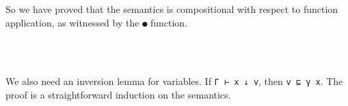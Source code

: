 So we have proved that the semantics is compositional with respect to
function application, as witnessed by the \texttt{●} function.

\begin{fence}
\begin{code}%
\>[0]\AgdaSpace{}%
\AgdaSymbol{:}\AgdaSpace{}%
\AgdaSymbol{\}\{}\AgdaSpace{}%
\AgdaSpace{}%
\AgdaSymbol{:}\AgdaSpace{}%
\AgdaSpace{}%
\AgdaSpace{}%
\AgdaSymbol{\}}\<%
\\
\>[0][@{}l@{\AgdaIndent{0}}]%
\>[2]\AgdaSpace{}%
\AgdaSpace{}%
\AgdaSymbol{(}\AgdaSpace{}%
\AgdaSpace{}%
\AgdaSymbol{)}\AgdaSpace{}%
\AgdaSpace{}%
\AgdaSymbol{(}\AgdaSpace{}%
\AgdaSymbol{)}\AgdaSpace{}%
\AgdaSpace{}%
\AgdaSymbol{(}\AgdaSpace{}%
\AgdaSymbol{)}\<%
\\
\>[0]\AgdaSpace{}%
\AgdaSpace{}%
\AgdaSpace{}%
\AgdaSymbol{=}\AgdaSpace{}%
\AgdaSpace{}%
\AgdaSpace{}%
\AgdaOperator{\AgdaInductiveConstructor{,}}\AgdaSpace{}%
\AgdaSpace{}%
\<%
\end{code}
\end{fence}

We also need an inversion lemma for variables. If
\texttt{Γ\ ⊢\ x\ ↓\ v}, then \texttt{v\ ⊑\ γ\ x}. The proof is a
straightforward induction on the semantics.

